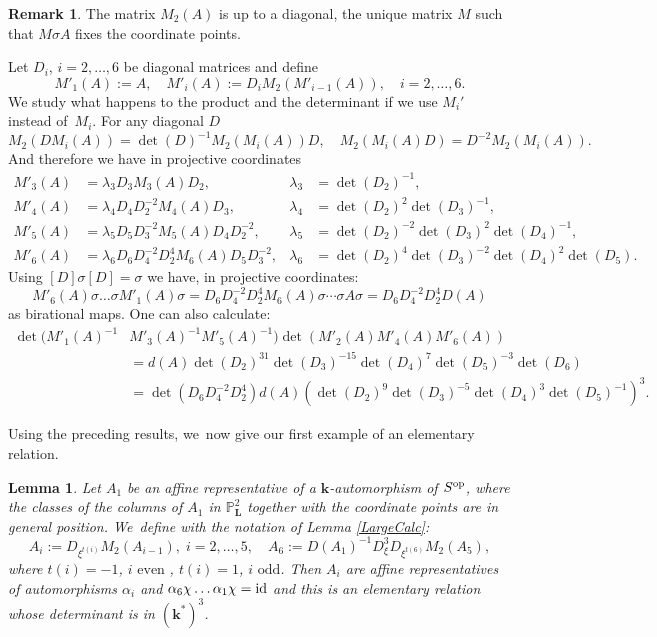 \documentclass[JEP,XML,SOM,Unicode,NoFloatCountersInSection, NoEqCountersInSection,published]{cedram}
\newcommand{\id}{\textup{id}}
\newcommand{\op}{\textup{op}}
\newtheorem{lemma}[theorem]{Lemma}
\theoremstyle{definition}
\newtheorem{remark}[theorem]{Remark}
\newcommand{\kk}{{\boldsymbol{k}}}
\newcommand{\LL}{{\boldsymbol{L}}}
\begin{document}
\begin{remark} \label{RemDiag}
The matrix $M_2(A)$ is up to a diagonal, the unique matrix $M$ such that $M \sigma A$ fixes the coordinate points.

Let $D_i$, $i=2, \dots ,6$ be diagonal matrices and define
\[
M'_1(A) := A, \quad M'_i(A) := D_i M_2(M'_{i-1}(A)), \quad i = 2, \dots , 6.
\]
We study what happens to the product and the determinant if we use $M_i'$ instead of~$M_i$. For any diagonal $D$
\[
M_2(DM_i(A)) = \det(D)^{-1}M_2(M_i(A))D, \quad M_2(M_i(A)D) = D^{-2}M_2(M_i(A)).
\]
And therefore we have in projective coordinates
\begin{align*}
M'_3(A) &= \lambda_3 D_3 M_3(A) D_2, & \lambda_3 &= \det(D_2)^{-1},
\\
M'_4(A) &= \lambda_4 D_4 D_2^{-2} M_4(A)D_3, &\lambda_4 &= \det (D_2)^2 \det(D_3)^{-1},
\\
M'_5(A) &= \lambda_5 D_5D_3^{-2}M_5(A)D_4D_2^{-2}, &\lambda_5 &= \det(D_2)^{-2} \det(D_3)^2 \det(D_4)^{-1},
\\
M'_6(A) &= \lambda_6 D_6 D_4^{-2}D_2^4 M_6(A)D_5D_3^{-2}, &\lambda_6&= \det(D_2)^{4} \det(D_3)^{-2} \det(D_4)^{2} \det(D_5).
\end{align*}
Using $[D] \sigma [D] = \sigma$ we have, in projective coordinates:
\[
M'_6(A) \sigma \dots \sigma M'_1(A)\sigma = D_6 D_4^{-2}D_2^4 M_6(A) \sigma \dotsm \sigma A \sigma = D_6 D_4^{-2}D_2^4 D(A)
\]
as birational maps. One can also calculate:
\begin{align*}
\det(M'_1(A)^{-1}&M'_3(A)^{-1}M'_5(A)^{-1})\det(M'_2(A)M'_4(A)M'_6(A))
\\
&= d(A) \det(D_2)^{31}\det(D_3)^{-15} \det(D_4)^{7}\det(D_5)^{-3} \det(D_6)
\\
&= \det(D_6 D_4^{-2}D_2^4) d(A) (\det(D_2)^{9}\det(D_3)^{-5} \det(D_4)^{3}\det(D_5)^{-1})^3.
\end{align*}
\end{remark}
Using the preceding results, we~now give our first example of an elementary relation.

\begin{lemma} \label{TrivEx}
Let $A_1$ be an affine representative of a $\kk$-automorphism of $S^{\op}$, where the classes of the columns of $A_1$ in $\mathbb{P}^2_{\LL}$ together with the coordinate points are in general position. We~define with the notation of Lemma \ref{LargeCalc}:
\[
A_i := D_{\xi^{t(i)}}M_2(A_{i-1}), \; i=2, \dots , 5 , \quad A_6 := D(A_1)^{-1}D_{\xi}^3D_{\xi^{t(6)}}M_2(A_5),
\]
where $t(i) = -1$, $i \text{ even }$, $t(i) = 1 $, $i \text{ odd}$. Then $A_i$ are affine representatives of automorphisms $\alpha_i$ and $\alpha_6 \chi \dots \alpha_1 \chi = \id$ and this is an elementary relation whose determinant is in $(\kk^*)^3$.
\end{lemma}
\end{document}
